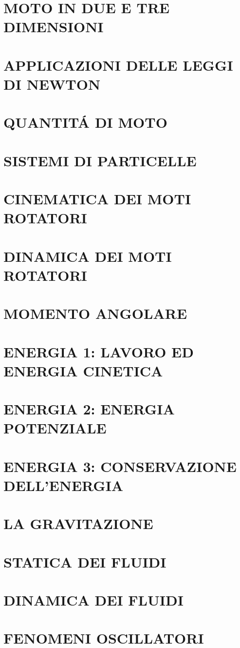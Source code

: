 \documentclass{article}
\begin{document}
	\section{MOTO IN DUE E TRE DIMENSIONI}
	\section{APPLICAZIONI DELLE LEGGI DI NEWTON}
	\section{QUANTIT\'A DI MOTO}
	\section{SISTEMI DI PARTICELLE}
	\section{CINEMATICA DEI MOTI ROTATORI}
	\section{DINAMICA DEI MOTI ROTATORI}
	\section{MOMENTO ANGOLARE}
	\section{ENERGIA 1: LAVORO ED ENERGIA CINETICA}
	\section{ENERGIA 2: ENERGIA POTENZIALE}
	\section{ENERGIA 3: CONSERVAZIONE DELL'ENERGIA}
	\section{LA GRAVITAZIONE}
	\section{STATICA DEI FLUIDI}
	\section{DINAMICA DEI FLUIDI}
	\section{FENOMENI OSCILLATORI}
\end{document}
